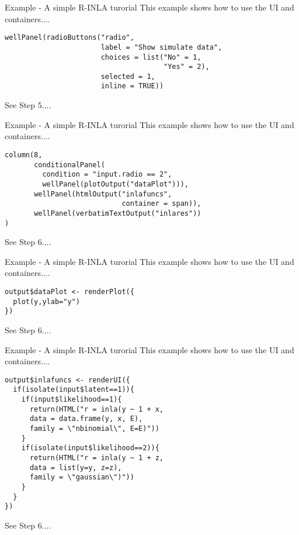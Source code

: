 \documentclass[compress]{beamer}
\begin{document}
\begin{frame}[fragile]{Example - A simple R-INLA turorial}
This example shows how to use the UI and containers....
\begin{tcolorbox}[colback=green!5,colframe=green!40!black, title=UI-Input 3]
\begin{verbatim}
wellPanel(radioButtons("radio", 
                       label = "Show simulate data",
                       choices = list("No" = 1, 
                                      "Yes" = 2),
                       selected = 1,
                       inline = TRUE))
\end{verbatim}
\end{tcolorbox}
See \alert{Step 5}....
\end{frame}


\begin{frame}[fragile]{Example - A simple R-INLA turorial}
This example shows how to use the UI and containers....
\begin{tcolorbox}[colback=green!5,colframe=green!40!black, title=``R-INLA'' UI-Output]
\begin{verbatim}
column(8,
       conditionalPanel(
         condition = "input.radio == 2",
         wellPanel(plotOutput("dataPlot"))),
       wellPanel(htmlOutput("inlafuncs", 
                            container = span)),
       wellPanel(verbatimTextOutput("inlares"))    
)
\end{verbatim}
\end{tcolorbox}
See \alert{Step 6}....
\end{frame}


\begin{frame}[fragile]{Example - A simple R-INLA turorial}
This example shows how to use the UI and containers....
\begin{tcolorbox}[colback=green!5,colframe=green!40!black, title=Corresponding reaction]
\begin{verbatim}
output$dataPlot <- renderPlot({
  plot(y,ylab="y")
})
\end{verbatim}
\end{tcolorbox}
See \alert{Step 6}....
\end{frame}

\begin{frame}[fragile]{Example - A simple R-INLA turorial}
This example shows how to use the UI and containers....
\begin{tcolorbox}[colback=green!5,colframe=green!40!black, title=Corresponding reaction]
\begin{verbatim}
output$inlafuncs <- renderUI({
  if(isolate(input$latent==1)){
    if(input$likelihood==1){
      return(HTML("r = inla(y ~ 1 + x, 
      data = data.frame(y, x, E), 
      family = \"nbinomial\", E=E)"))
    }
    if(isolate(input$likelihood==2)){
      return(HTML("r = inla(y ~ 1 + z, 
      data = list(y=y, z=z),
      family = \"gaussian\")"))
    }
  }
})
\end{verbatim}
\end{tcolorbox}
See \alert{Step 6}....
\end{frame}
\end{document}
